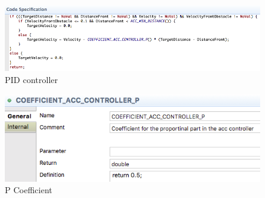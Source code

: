 \begin{figure}[!h]
\centering
\includegraphics[width=1\textwidth]{images/code_spec_P_controller.png}
\caption{PID controller \af}
\label{fig:pid_controller}
\end{figure}

\begin{figure}[!h]
\centering
\includegraphics[width=.7\textwidth]{images/P_coefficient_controller.png}
\caption{P Coefficient}
\label{fig:p_coefficient}
\end{figure}
